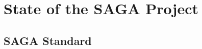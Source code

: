 \documentclass{article}
\newcommand{\I}[1]{\textit{#1}}
\newcommand{\B}[1]{\textbf{#1}}
\newcommand{\todo}[1]{{\textcolor{red}{\B{TODO:} #1 }}}
\newcommand{\jhanote}[1]{{\textcolor{red}{     \B{Shantenu:} #1 }}}
\newcommand{\jhanote}[1]{}
\begin{document}


  


\section{State of the SAGA Project}
\label{sec:state}


\subsection{SAGA Standard}
 
\end{document}
